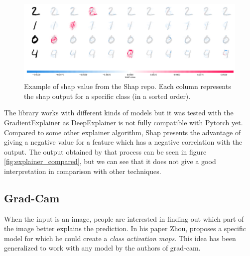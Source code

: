 \begin{figure}
 \centering
 \includegraphics[width=.9\linewidth]{figures/shap_mnist_image_plot.png}
 \captionsetup{width=.9\linewidth}
 \caption[ShapExample]{Example of shap value from the Shap repo\footnotemark{}. Each column represents the shap output for a specific class (in a sorted order).}
 \label{fig:shap_example}
\end{figure}

The library\cite{shap_lundberg2017unified} works with different kinds of models but it was tested with the GradientExplainer as DeepExplainer is not fully compatible with Pytorch yet. Compared to some other explainer algorithm, Shap presents the advantage of giving a negative value for a feature which has a negative correlation with the output. The output obtained by that process can be seen in figure \ref{fig:explainer_compared}, but we can see that it does not give a good interpretation in comparison with other techniques.



\subsection{Grad-Cam}
When the input is an image, people are interested in finding out which part of the image better explains the prediction. In his paper\cite{zhou2015cnnlocalization} Zhou, proposes a specific model for which he could create a \textit{class activation maps}. This idea has been generalized to work with any model by the authors of grad-cam. 

